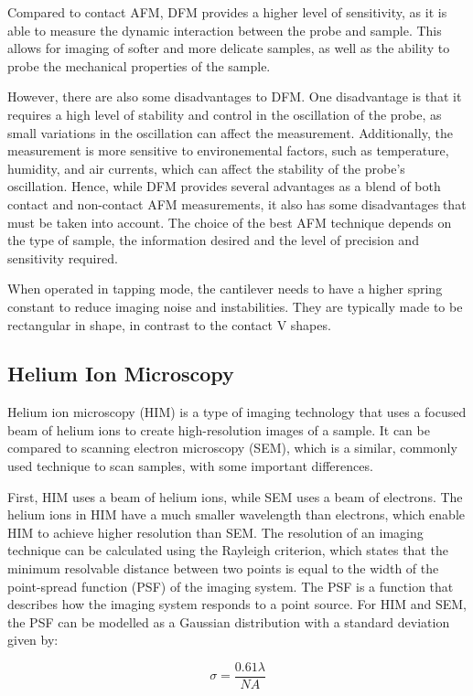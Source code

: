 Compared to contact AFM, DFM provides a higher level of sensitivity, as it is able to measure the dynamic interaction between the probe and sample. This allows for imaging of softer and more delicate samples, as well as the ability to probe the mechanical properties of the sample.

However, there are also some disadvantages to DFM. One disadvantage is that it requires a high level of stability and control in the oscillation of the probe, as small variations in the oscillation can affect the measurement. Additionally, the measurement is more sensitive to environemental factors, such as temperature, humidity, and air currents, which can affect the stability of the probe's oscillation. Hence, while DFM provides several advantages as a blend of both contact and non-contact AFM measurements, it also has some disadvantages that must be taken into account. The choice of the best AFM technique depends on the type of sample, the information desired and the level of precision and sensitivity required.

When operated in tapping mode, the cantilever needs to have a higher spring constant to reduce imaging noise and instabilities. They are typically made to be rectangular in shape, in contrast to the contact V shapes.  
\subsection{Helium Ion Microscopy}
Helium ion microscopy (HIM) is a type of imaging technology that uses a focused beam of helium ions to create high-resolution images of a sample. It can be compared to scanning electron microscopy (SEM), which is a similar, commonly used technique to scan samples, with some important differences.

First, HIM uses a beam of helium ions, while SEM uses a beam of electrons. The helium ions in HIM have a much smaller wavelength than electrons, which enable HIM to achieve higher resolution than SEM. The resolution of an imaging technique can be calculated using the Rayleigh criterion, which states that the minimum resolvable distance between two points is equal to the width of the point-spread function (PSF) of the imaging system. The PSF is a function that describes how the imaging system responds to a point source. For HIM and SEM, the PSF can be modelled as a Gaussian distribution with a standard deviation given by:

\begin{equation}
    \sigma = \frac{0.61\lambda}{NA}
    \label{eq:PSF_standard_deviation}
\end{equation}

